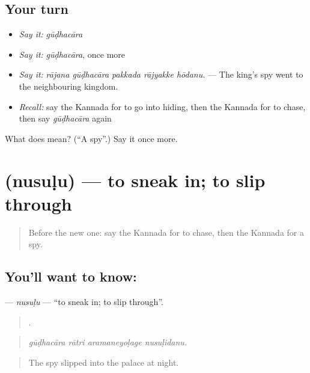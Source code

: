 \subsection*{Your turn}
\begin{itemize}
\raggedright
  \item \emph{Say it:} \emph{gūḍhacāra}
  \item \emph{Say it:} \emph{gūḍhacāra}, once more
  \item \emph{Say it:} \emph{rājana gūḍhacāra pakkada rājyakke hōdanu.} — The king's spy went to the neighbouring kingdom.
  \item \emph{Recall:} say the Kannada for to go into hiding, then the Kannada for to chase, then say \emph{gūḍhacāra} again
\end{itemize}

\begin{tcolorbox}[breakable,colback=teal!4,colframe=teal!35!black,title={Before you move on}]
What does  mean? (\textquotedblleft{}A spy\textquotedblright{}.) Say it once more.
\end{tcolorbox}
\section[\texorpdfstring{\kn{ನುಸುಳು} (nusuḷu)}{ನುಸುಳು (nusuḷu)}]{ (nusuḷu) — to sneak in; to slip through}

\label{lesson:KA-C345-nusulu}



\begin{quote}
Before the new one: say the Kannada for to chase, then the Kannada for a spy.
\end{quote}

\subsection*{You'll want to know: }
\textbf{} — \emph{nusuḷu} — \textquotedblleft{}to sneak in; to slip through\textquotedblright{}.

\begin{quote}
   .
\end{quote}

\begin{quote}
\emph{gūḍhacāra rātri aramaneyoḷage nusuḷidanu.}
\end{quote}

\begin{quote}
The spy slipped into the palace at night.
\end{quote}

